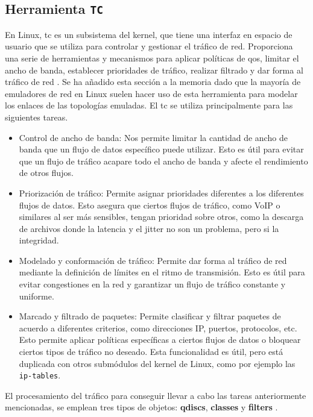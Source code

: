 \subsection{Herramienta \texttt{TC}}


En Linux, \gls{tc} es un subsistema del kernel, que tiene una interfaz en espacio de usuario que se utiliza para controlar y gestionar el tráfico de red. Proporciona una serie de herramientas y mecanismos para aplicar políticas de \gls{qos}, limitar el ancho de banda, establecer prioridades de tráfico, realizar filtrado y dar forma al tráfico de red \cite{tc1}. Se ha añadido esta sección a la memoria dado que la mayoría de emuladores de red en Linux suelen hacer uso de esta herramienta para modelar los enlaces de las topologías emuladas. El \gls{tc}  se utiliza principalmente para las siguientes tareas.

\begin{itemize}
    \item Control de ancho de banda: Nos permite limitar la cantidad de ancho de banda que un flujo de datos específico puede utilizar. Esto es útil para evitar que un flujo de tráfico acapare todo el ancho de banda y afecte el rendimiento de otros flujos.

    \item Priorización de tráfico: Permite asignar prioridades diferentes a los diferentes flujos de datos. Esto asegura que ciertos flujos de tráfico, como VoIP o similares al ser más sensibles, tengan prioridad sobre otros, como la descarga de archivos donde la latencia y el jitter no son un problema, pero si la integridad.

    \item Modelado y conformación de tráfico: Permite dar forma al tráfico de red mediante la definición de límites en el ritmo de transmisión. Esto es útil para evitar congestiones en la red y garantizar un flujo de tráfico constante y uniforme.

    \item Marcado y filtrado de paquetes: Permite clasificar y filtrar paquetes de acuerdo a diferentes criterios, como direcciones IP, puertos, protocolos, etc. Esto permite aplicar políticas específicas a ciertos flujos de datos o bloquear ciertos tipos de tráfico no deseado. Esta funcionalidad es útil, pero está duplicada con otros submódulos del kernel de Linux, como por ejemplo las \texttt{ip-tables}.
\end{itemize}

El procesamiento del tráfico para conseguir llevar a cabo las tareas anteriormente mencionadas, se emplean tres tipos de objetos: \textbf{qdiscs}, \textbf{classes} y \textbf{filters} \cite{tc1}.

